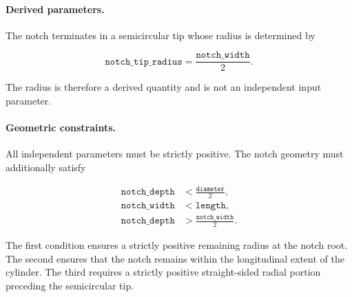 \paragraph{Derived parameters.}

The notch terminates in a semicircular tip
whose radius is determined by

\begin{equation}
\texttt{notch\_tip\_radius}
=\frac{\texttt{notch\_width}}{2}.
\end{equation}

The radius is therefore a derived quantity
and is not an independent input parameter.

\paragraph{Geometric constraints.}

All independent parameters must be strictly
positive. The notch geometry must additionally
satisfy

\begin{align}
\texttt{notch\_depth}
&< \frac{\texttt{diameter}}{2},
\\
\texttt{notch\_width}
&< \texttt{length},
\\
\texttt{notch\_depth}
&> \frac{\texttt{notch\_width}}{2}.
\end{align}

The first condition ensures a strictly positive
remaining radius at the notch root. The second
ensures that the notch remains within the
longitudinal extent of the cylinder. The third
requires a strictly positive straight-sided
radial portion preceding the semicircular tip.
